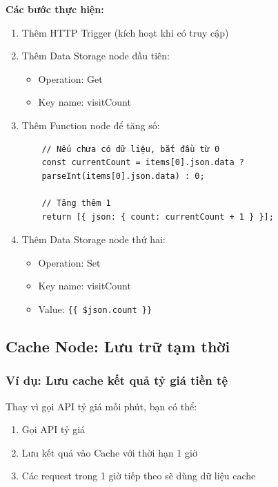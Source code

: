 \textbf{Các bước thực hiện:}
\begin{enumerate}
    \item Thêm HTTP Trigger (kích hoạt khi có truy cập)
    \item Thêm Data Storage node đầu tiên:
    \begin{itemize}
        \item Operation: Get
        \item Key name: visitCount
    \end{itemize}
    \item Thêm Function node để tăng số:
    \begin{verbatim}
    // Nếu chưa có dữ liệu, bắt đầu từ 0
    const currentCount = items[0].json.data ?
    parseInt(items[0].json.data) : 0;
    
    // Tăng thêm 1
    return [{ json: { count: currentCount + 1 } }];
    \end{verbatim}
    \item Thêm Data Storage node thứ hai:
    \begin{itemize}
        \item Operation: Set
        \item Key name: visitCount
        \item Value: \verb|{{ $json.count }}|
    \end{itemize}
\end{enumerate}

\subsection{Cache Node: Lưu trữ tạm thời}

\subsubsection{Ví dụ: Lưu cache kết quả tỷ giá tiền tệ}

Thay vì gọi API tỷ giá mỗi phút, bạn có thể:
\begin{enumerate}
    \item Gọi API tỷ giá
    \item Lưu kết quả vào Cache với thời hạn 1 giờ
    \item Các request trong 1 giờ tiếp theo sẽ dùng dữ liệu cache
\end{enumerate}


